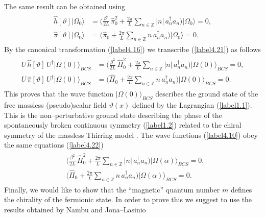 \documentclass[a4paper,12pt] {article}
\begin{document}
The same result can be obtained using
%
\begin{eqnarray}\label{label4.21}
\begin{aligned}
\hat{h}[\vartheta]|\Omega_0 \rangle &=
\Big(\frac{\beta^2}{2L}\,\hat{\pi}^2_0 + \frac{2\pi}{L}\sum_{n \in
\mathbb{Z}}|n|\,a^{\dagger}_n a_n\Big)|\Omega_0 \rangle = 0,\\
\hat{\pi}[\vartheta]|\Omega_0 \rangle &=
\Big(\hat{\pi}_0 + \frac{2\pi}{L}\sum_{n \in
\mathbb{Z}}n\,a^{\dagger}_n a_n\Big)|\Omega_0 \rangle = 0.
\end{aligned}
\end{eqnarray}
%
By the canonical transformation (\ref{label4.16}) we transcribe
(\ref{label4.21}) as follows
%
\begin{eqnarray}\label{label4.22}
\begin{aligned}
U\,\hat{h}[\vartheta]\,U^{\dagger} |\Omega(0)\rangle_{BCS}
&=\Big(\frac{\beta^2}{2L}\,\hat{\Pi}^2_0 + \frac{2\pi}{L}\sum_{n \in
\mathbb{Z}}|n|\,a^{\dagger}_n a_n\Big)|\Omega(0)\rangle_{BCS} = 0,\\
U\,\hat{\pi}[\vartheta]\,U^{\dagger} |\Omega(0)\rangle_{BCS}
&= \Big(\hat{\Pi}_0 + \frac{2\pi}{L}\sum_{n \in
\mathbb{Z}}n\,a^{\dagger}_n a_n\Big)|\Omega(0)\rangle_{BCS} = 0.
\end{aligned}
\end{eqnarray}
%
This proves that the wave function $|\Omega(0)\rangle_{BCS}$
describes the ground state of the free massless (pseudo)scalar field
$\vartheta(x)$ defined by the Lagrangian (\ref{label1.1}). This is the
non--perturbative ground state describing the phase of the
spontaneously broken continuous symmetry (\ref{label1.2}) related to
the chiral symmetry of the massless Thirring model
\cite{th0105057,th0112184}. The wave functions (\ref{label4.10}) obey
the same equations (\ref{label4.22})
%
\begin{eqnarray}\label{label4.23}
\begin{aligned}
&\Big(\frac{\beta^2}{2L}\,\hat{\Pi}^2_0 + \frac{2\pi}{L}\sum_{n \in
\mathbb{Z}}|n|\,a^{\dagger}_n a_n\Big)|\Omega(\alpha)\rangle_{BCS} =
0,\\ &\Big(\hat{\Pi}_0 + \frac{2\pi}{L}\sum_{n \in
\mathbb{Z}}n\,a^{\dagger}_n a_n\Big)|\Omega(\alpha)\rangle_{BCS} = 0.
\end{aligned}
\end{eqnarray}
%
Finally, we would like to show that the ``magnetic'' quantum number $m$
defines the chirality of the fermionic state. In order to prove this
we suggest to use the results obtained by Nambu and Jona--Lasinio
\end{document}
